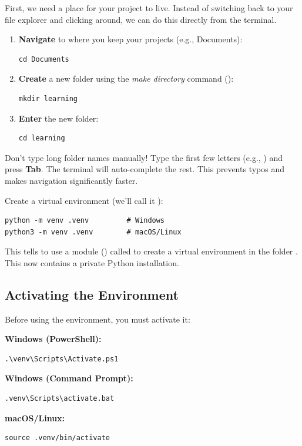 First, we need a place for your project to live. Instead of switching back to your file explorer and clicking around, we can do this directly from the terminal.

\begin{enumerate}
    \item \textbf{Navigate} to where you keep your projects (e.g., Documents):
    \begin{lstlisting}[style=shellstyle]
    cd Documents
    \end{lstlisting}

    \item \textbf{Create} a new folder using the \emph{make directory} command ():
    \begin{lstlisting}[style=shellstyle]
    mkdir learning
    \end{lstlisting}

    \item \textbf{Enter} the new folder:
    \begin{lstlisting}[style=shellstyle]
    cd learning
    \end{lstlisting}
\end{enumerate}

\begin{tip}
Don't type long folder names manually! Type the first few letters (e.g., ) and press \textbf{Tab}. The terminal will auto-complete the rest. This prevents typos and makes navigation significantly faster.
\end{tip}

Create a virtual environment (we'll call it ):

\begin{lstlisting}[style=shellstyle]
python -m venv .venv         # Windows
python3 -m venv .venv        # macOS/Linux
\end{lstlisting}

This tells  to use a module () called  to create a virtual environment in the folder . This now contains a private Python installation.

\subsection{Activating the Environment}

Before using the environment, you must activate it:

\begin{osbox}
\textbf{Windows (PowerShell):}
\begin{lstlisting}[style=shellstyle]
.\venv\Scripts\Activate.ps1
\end{lstlisting}

\textbf{Windows (Command Prompt):}
\begin{lstlisting}[style=shellstyle]
.venv\Scripts\activate.bat
\end{lstlisting}

\textbf{macOS/Linux:}
\begin{lstlisting}[style=shellstyle]
source .venv/bin/activate
\end{lstlisting}
\end{osbox}

